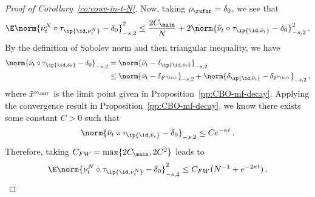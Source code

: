 \documentclass{amsart}
\begin{document}
\begin{proof}[Proof of Corollary~\ref{co:conv-in-t-N}]
    Now, taking $\rho_\refer = \delta_0$, we see that
    \begin{equation*}
        \E \norm{\nu^N_t \circ \tau_{\ip{\id, \nu^N_t}} - \delta_0}_{-s,2}^2 \le \frac{2C_\main}{N} + 2\norm{\bar\nu_t \circ \tau_{\ip{\id, \bar\nu_t}} - \delta_0}_{-s,2}^2 \,.
    \end{equation*}
    By the definition of Sobolev norm and then triangular inequality, we have
    \begin{align*}
        \norm{\bar\nu_t \circ \tau_{\ip{\id, \bar\nu_t}} - \delta_0}_{-s,2} & = \norm{\bar\nu_t  - \delta_{\ip{\id,\bar\nu_t}} }_{-s,2} \\
        & \le \norm{\bar\nu_t  - \delta_{\tilde x^{\nu_\init}} }_{-s,2} + \norm{\delta_{\ip{\id,\bar\nu_t}} - \delta_{\tilde x^{\nu_\init}} }_{-s,2} \,,
    \end{align*}
    where $\tilde x^{\nu_\init}$ is the limit point given in Proposition~\ref{pp:CBO-mf-decay}.
    Applying the convergence result in Proposition~\ref{pp:CBO-mf-decay}, we know there exists some constant $C > 0$ such that 
    \begin{equation*}
        \norm{\bar\nu_t \circ \tau_{\ip{\id, \bar\nu_t}} - \delta_0}_{-s,2} \le C e^{-\kappa t} \,.
    \end{equation*}
    Therefore, taking $C_{FW} = \max \{2C_\main, 2C^2\} $ leads to 
    \begin{equation*}
        \E \norm{\nu^N_t \circ \tau_{\ip{\id, \nu^N_t}} - \delta_0}_{-s,2}^2 \le C_{FW}  (N^{-1} + e^{-2\kappa t}) \,.
    \end{equation*}
\end{proof}
\end{document}
